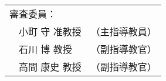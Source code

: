 \newpage
\thispagestyle{empty}
\vspace*{8cm}
\begin{center}


 \bigskip

 \jauthor
 \vspace*{0.4cm}
 \begin{table}[h]
 \begin{center}
	\begin{tabular}[t]{p{}ll}
	 \multicolumn{2}{l}{審査委員：} \\
	 & 小町 守 准教授 & （主指導教員） \\
	 & 石川 博 教授 & （副指導教官） \\
	 & 高間 康史 教授 & （副指導教官）
	\end{tabular}
 \end{center}
 \end{table}
 \end{center}